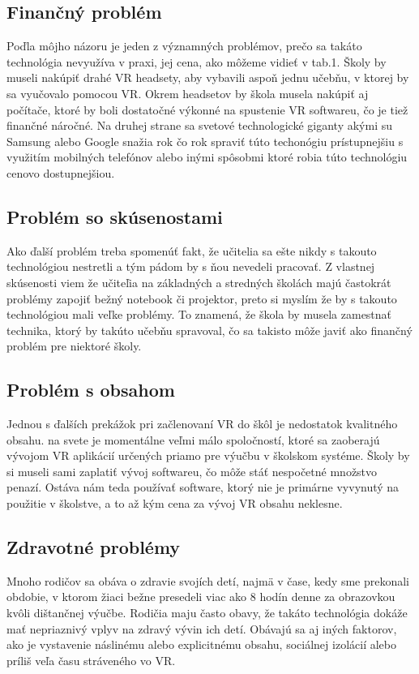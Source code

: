 \subsection{Finančný problém}
\par \qquad Poďla môjho názoru je jeden z významných problémov, prečo sa takáto technológia nevyužíva v praxi, jej
cena, ako môžeme vidieť v tab.1. Školy by museli nakúpiť drahé VR headsety, aby vybavili aspoň 
jednu učebňu, v ktorej by sa vyučovalo pomocou VR. Okrem headsetov by škola musela nakúpiť
aj počítače, ktoré by boli dostatočné výkonné na spustenie VR softwareu, čo je tiež finančné náročné.
Na druhej strane sa svetové technologické giganty akými su Samsung alebo Google snažia rok čo rok spraviť túto
techonógiu prístupnejšiu s využitím mobilných telefónov alebo inými spôsobmi ktoré robia túto technológiu
cenovo dostupnejšiou\citep{Zdroj3}.

\subsection{Problém so skúsenostami}
\par \qquad Ako ďalší problém treba spomenúť fakt, že učitelia sa ešte nikdy s takouto technológiou nestretli
a tým pádom by s ňou nevedeli pracovať. Z vlastnej skúsenosti viem že učiteľia na základných a stredných 
školách majú častokrát problémy zapojiť 
bežný notebook či projektor, preto si myslím že by s takouto technológiou mali veľke problémy.
To znamená, že škola by musela zamestnať technika, ktorý by takúto učebňu spravoval, čo sa takisto môže javiť ako
finančný problém pre niektoré školy.

\subsection{Problém s obsahom}
\par \qquad Jednou s ďalších prekážok pri začlenovaní VR do škôl je nedostatok kvalitného obsahu.
na svete je momentálne veľmi málo spoločností, ktoré sa zaoberajú vývojom VR aplikácií určených
priamo pre výučbu v školskom systéme. Školy by si museli sami zaplatiť vývoj softwareu, čo môže
stáť nespočetné množstvo penazí. Ostáva nám teda používať software, ktorý nie je primárne vyvynutý
na použitie v školstve, a to až kým cena za vývoj VR obsahu neklesne\citep{Zdroj4}.

\subsection{Zdravotné problémy}
\par \qquad Mnoho rodičov sa obáva o zdravie svojích detí, najmä v čase, kedy sme prekonali obdobie,
v ktorom žiaci bežne presedeli viac ako 8 hodín denne za obrazovkou kvôli dištančnej výučbe. Rodičia
maju často obavy, že takáto technológia dokáže mať nepriaznivý vplyv na zdravý vývin ich detí. Obávajú 
sa aj iných faktorov, ako je vystavenie náslinému alebo explicitnému obsahu, sociálnej izolácií
alebo príliš veľa času stráveného vo VR\citep{Zdroj4}.